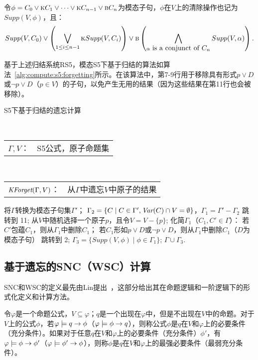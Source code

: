 令$\phi=C_0 \vee \textsc{k} C_1 \vee \dots \vee \textsc{k} C_{n-1} \vee \textsc{b} C_n$为模态子句，$\phi$在$V$上的清除操作也记为$Supp(V,\phi)$，且：
$$Supp(V, C_0) \vee \left(\bigvee_{1\leq i\leq n-1} \textsc{k} Supp(V, C_i)\right) \vee \textsc{b}\left(\bigwedge_{\alpha\hbox{ is a conjunct of $C_n$}} Supp(V, \alpha)\right).$$

基于上述归结系统RS5，模态S5下基于归结的算法如算法~\ref{alg:compute:s5:forgetting}所示。在该算法中，第7-9行用于移除具有形式$p\vee D$或$\neg p \vee D$（$p\in V$）的子句，以免产生无用的结果（因为这些结果在第11行也会被移除）。


\begin{algorithm}[htbp]
	\small
	\caption{S5下基于归结的遗忘计算}%
	\label{alg:compute:s5:forgetting}
	\begin{algorithmic}[1]
		\REQUIRE ~~\\
		\begin{tabular}[t]{p{8mm}l}
			$\Gamma, V$：& S5公式，原子命题集
		\end{tabular}
		\ENSURE ~~\\
		\begin{tabular}[t]{p{8mm}l}
			$\textit{KForget}(\Gamma, V)$：  & \qquad \quad 从$\Gamma$中遗忘$V$中原子的结果
		\end{tabular}
		\STATE 将$\Gamma$转换为模态子句集$\Gamma'$；
		\STATE $\Gamma_2=\{C\mid C\in \Gamma', \textit{Var}(C) \cap V = \emptyset\}$，$\Gamma_1=\Gamma' - \Gamma_2$
		\STATE 跳转到 11;
		\ENDIF
		\STATE 从$V$中随机选择一个原子$p$，且令$V = V -\{p\}$;
		\STATE 化简$\Gamma_1$（$C_1, C'\in \Gamma$）：
		\STATE \qquad 若$C'$包蕴$C_1$，则从$\Gamma_1$中删除$C_1$；
		\STATE \qquad 若$C_1$形如$p\vee D$或$\neg p \vee D$，则从$\Gamma_1$中删除$C_1$（$D$为模态子句）
		\STATE 跳转到 2;
		\STATE $\Gamma_3=\{Supp(V, \phi) \mid \phi \in \Gamma_1\}$;
		\RETURN $\Gamma \cup \Gamma_3$.
	\end{algorithmic}
\end{algorithm}


\subsection{基于遗忘的SNC（WSC）计算}
SNC和WSC的定义最先由Lin提出~\cite{DBLP:journals/ai/Lin01}，这部分给出其在命题逻辑和一阶逻辑下的形式化定义和计算方法。

\begin{definition}
	令$\varphi$是一个命题公式，$V\subseteq \varphi$；$q$是一个出现在$\varphi$中，但是不出现在$V$中的命题。对于$V$上的公式$\phi$，若$\varphi \models q \rightarrow \phi$（$\varphi \models \phi \rightarrow q$），则称公式$\phi$是$q$在$V$和$\varphi$上的必要条件（充分条件）。如果对于任意$q$在$V$和$\varphi$上的必要条件（充分条件）$\phi'$，有$\varphi \models \phi \rightarrow \phi'$（$\varphi \models \phi' \rightarrow \phi$），则称$\phi$是$q$在$V$和$\varphi$上的最强必要条件（最弱充分条件）。
\end{definition}

